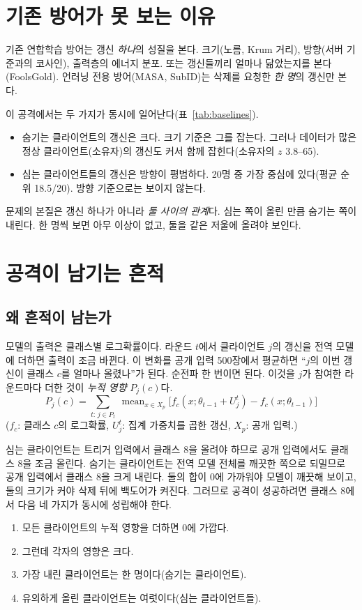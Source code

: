 \documentclass[10pt,a4paper]{article}
\begin{document}
\section{기존 방어가 못 보는 이유}
기존 연합학습 방어는 갱신 \emph{하나}의 성질을 본다. 크기(노름, Krum 거리), 방향(서버 기준과의 코사인), 출력층의 에너지 분포. 또는 갱신들끼리 얼마나 닮았는지를 본다(FoolsGold). 언러닝 전용 방어(MASA, SubID)는 삭제를 요청한 \emph{한 명}의 갱신만 본다.

이 공격에서는 두 가지가 동시에 일어난다(표~\ref{tab:baselines}).
\begin{itemize}
\item 숨기는 클라이언트의 갱신은 크다. 크기 기준은 그를 잡는다. 그러나 데이터가 많은 정상 클라이언트(소유자)의 갱신도 커서 함께 잡힌다(소유자의 $z$ 3.8--65).
\item 심는 클라이언트들의 갱신은 방향이 평범하다. 20명 중 가장 중심에 있다(평균 순위 18.5/20). 방향 기준으로는 보이지 않는다.
\end{itemize}
문제의 본질은 갱신 하나가 아니라 \emph{둘 사이의 관계}다. 심는 쪽이 올린 만큼 숨기는 쪽이 내린다. 한 명씩 보면 아무 이상이 없고, 둘을 같은 저울에 올려야 보인다.

\section{공격이 남기는 흔적}
\subsection{왜 흔적이 남는가}
모델의 출력은 클래스별 로그확률이다. 라운드 $t$에서 클라이언트 $j$의 갱신을 전역 모델에 더하면 출력이 조금 바뀐다. 이 변화를 공개 입력 500장에서 평균하면 ``$j$의 이번 갱신이 클래스 $c$를 얼마나 올렸나''가 된다. 순전파 한 번이면 된다. 이것을 $j$가 참여한 라운드마다 더한 것이 \emph{누적 영향} $P_j(c)$다.
\begin{equation}
P_j(c)=\sum_{t:\,j\in P_t}\ \operatorname{mean}_{x\in X_p}\big[f_c(x;\theta_{t-1}+U_j^t)-f_c(x;\theta_{t-1})\big]
\end{equation}
($f_c$: 클래스 $c$의 로그확률, $U_j^t$: 집계 가중치를 곱한 갱신, $X_p$: 공개 입력.)

심는 클라이언트는 트리거 입력에서 클래스 8을 올려야 하므로 공개 입력에서도 클래스 8을 조금 올린다. 숨기는 클라이언트는 전역 모델 전체를 깨끗한 쪽으로 되밀므로 공개 입력에서 클래스 8을 크게 내린다. 둘의 합이 0에 가까워야 모델이 깨끗해 보이고, 둘의 크기가 커야 삭제 뒤에 백도어가 켜진다. 그러므로 공격이 성공하려면 클래스 8에서 다음 네 가지가 동시에 성립해야 한다.
\begin{enumerate}
\item 모든 클라이언트의 누적 영향을 더하면 0에 가깝다.
\item 그런데 각자의 영향은 크다.
\item 가장 내린 클라이언트는 한 명이다(숨기는 클라이언트).
\item 유의하게 올린 클라이언트는 여럿이다(심는 클라이언트들).
\end{enumerate}
\end{document}
